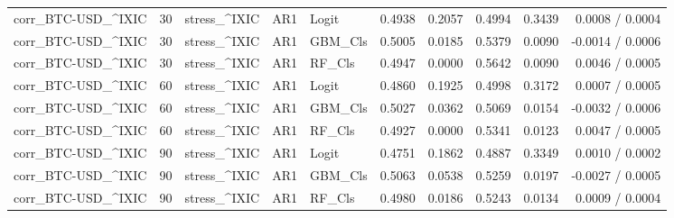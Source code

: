 \begin{table}[H]
\begin{tabular}{lllllrrrrr}
corr_BTC-USD_^IXIC & 30 & stress_^IXIC & AR1 & Logit & 0.4938 & 0.2057 & 0.4994 & 0.3439 & 0.0008 / 0.0004 \\
corr_BTC-USD_^IXIC & 30 & stress_^IXIC & AR1 & GBM_Cls & 0.5005 & 0.0185 & 0.5379 & 0.0090 & -0.0014 / 0.0006 \\
corr_BTC-USD_^IXIC & 30 & stress_^IXIC & AR1 & RF_Cls & 0.4947 & 0.0000 & 0.5642 & 0.0090 & 0.0046 / 0.0005 \\
corr_BTC-USD_^IXIC & 60 & stress_^IXIC & AR1 & Logit & 0.4860 & 0.1925 & 0.4998 & 0.3172 & 0.0007 / 0.0005 \\
corr_BTC-USD_^IXIC & 60 & stress_^IXIC & AR1 & GBM_Cls & 0.5027 & 0.0362 & 0.5069 & 0.0154 & -0.0032 / 0.0006 \\
corr_BTC-USD_^IXIC & 60 & stress_^IXIC & AR1 & RF_Cls & 0.4927 & 0.0000 & 0.5341 & 0.0123 & 0.0047 / 0.0005 \\
corr_BTC-USD_^IXIC & 90 & stress_^IXIC & AR1 & Logit & 0.4751 & 0.1862 & 0.4887 & 0.3349 & 0.0010 / 0.0002 \\
corr_BTC-USD_^IXIC & 90 & stress_^IXIC & AR1 & GBM_Cls & 0.5063 & 0.0538 & 0.5259 & 0.0197 & -0.0027 / 0.0005 \\
corr_BTC-USD_^IXIC & 90 & stress_^IXIC & AR1 & RF_Cls & 0.4980 & 0.0186 & 0.5243 & 0.0134 & 0.0009 / 0.0004 \\
\bottomrule
\end{tabular}
\end{table}